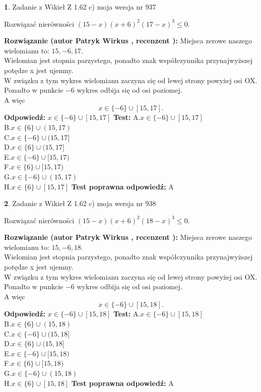 \documentclass[12pt, a4paper]{article}
\theoremstyle{definition} %
\newtheorem{zad}{}
\newcommand{\zadStart}[1]{\begin{zad}#1\newline}
\newcommand{\zadStop}{\end{zad}}
\newcommand{\rozwStart}[2]{\noindent \textbf{Rozwiązanie (autor #1 , recenzent #2): }\newline}
\newcommand{\rozwStop}{\newline}
\newcommand{\odpStart}{\noindent \textbf{Odpowiedź:}\newline}
\newcommand{\odpStop}{\newline}
\newcommand{\testStart}{\noindent \textbf{Test:}\newline}
\newcommand{\testStop}{\newline}
\newcommand{\kluczStart}{\noindent \textbf{Test poprawna odpowiedź:}\newline}
\newcommand{\kluczStop}{\newline}
\begin{document}
\zadStart{Zadanie z Wikieł Z 1.62 c) moja wersja nr 937}

Rozwiązać nierówności $(15-x)(x+6)^{2}(17-x)^{3}\le0$.
\zadStop
\rozwStart{Patryk Wirkus}{}
Miejsca zerowe naszego wielomianu to: $15, -6, 17$.\\
Wielomian jest stopnia parzystego, ponadto znak współczynnika przy\linebreak najwyższej potędze x jest ujemny.\\ W związku z tym wykres wielomianu zaczyna się od lewej strony powyżej osi OX.\\
Ponadto w punkcie $-6$ wykres odbija się od osi poziomej.\\
A więc $$x \in \{-6\} \cup [15,17].$$
\rozwStop
\odpStart
$x \in \{-6\} \cup [15,17]$
\odpStop
\testStart
A.$x \in \{-6\} \cup [15,17]$\\
B.$x \in \{6\} \cup (15,17)$\\
C.$x \in \{-6\} \cup (15,17]$\\
D.$x \in \{6\} \cup (15,17]$\\
E.$x \in \{-6\} \cup [15,17)$\\
F.$x \in \{6\} \cup [15,17)$\\
G.$x \in \{-6\} \cup (15,17)$\\
H.$x \in \{6\} \cup [15,17]$
\testStop
\kluczStart
A
\kluczStop



\zadStart{Zadanie z Wikieł Z 1.62 c) moja wersja nr 938}

Rozwiązać nierówności $(15-x)(x+6)^{2}(18-x)^{3}\le0$.
\zadStop
\rozwStart{Patryk Wirkus}{}
Miejsca zerowe naszego wielomianu to: $15, -6, 18$.\\
Wielomian jest stopnia parzystego, ponadto znak współczynnika przy\linebreak najwyższej potędze x jest ujemny.\\ W związku z tym wykres wielomianu zaczyna się od lewej strony powyżej osi OX.\\
Ponadto w punkcie $-6$ wykres odbija się od osi poziomej.\\
A więc $$x \in \{-6\} \cup [15,18].$$
\rozwStop
\odpStart
$x \in \{-6\} \cup [15,18]$
\odpStop
\testStart
A.$x \in \{-6\} \cup [15,18]$\\
B.$x \in \{6\} \cup (15,18)$\\
C.$x \in \{-6\} \cup (15,18]$\\
D.$x \in \{6\} \cup (15,18]$\\
E.$x \in \{-6\} \cup [15,18)$\\
F.$x \in \{6\} \cup [15,18)$\\
G.$x \in \{-6\} \cup (15,18)$\\
H.$x \in \{6\} \cup [15,18]$
\testStop
\kluczStart
A
\kluczStop
\end{document}
